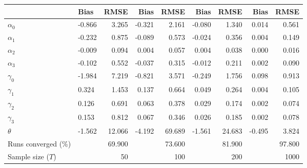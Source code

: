 
\begin{tabular}[t]{llrrrrrrr}
\toprule
  & Bias & RMSE & Bias & RMSE & Bias & RMSE & Bias & RMSE\\
\midrule
$\alpha_{0}$ & -0.866 & 3.265 & -0.321 & 2.161 & -0.080 & 1.340 & 0.014 & 0.561\\
$\alpha_{1}$ & -0.232 & 0.875 & -0.089 & 0.573 & -0.024 & 0.356 & 0.004 & 0.149\\
$\alpha_{2}$ & -0.009 & 0.094 & 0.004 & 0.057 & 0.004 & 0.038 & 0.000 & 0.016\\
$\alpha_{3}$ & -0.102 & 0.552 & -0.037 & 0.315 & -0.012 & 0.211 & 0.002 & 0.090\\
$\gamma_{0}$ & -1.984 & 7.219 & -0.821 & 3.571 & -0.249 & 1.756 & 0.098 & 0.913\\
$\gamma_{1}$ & 0.324 & 1.453 & 0.137 & 0.664 & 0.049 & 0.264 & 0.004 & 0.105\\
$\gamma_{2}$ & 0.126 & 0.691 & 0.063 & 0.378 & 0.029 & 0.174 & 0.002 & 0.074\\
$\gamma_{3}$ & 0.153 & 0.812 & 0.067 & 0.346 & 0.026 & 0.185 & 0.002 & 0.078\\
$\theta$ & -1.562 & 12.066 & -4.192 & 69.689 & -1.561 & 24.683 & -0.495 & 3.824\\
Runs converged (\%) &  & 69.900 &  & 73.600 &  & 81.900 &  & 97.800\\
Sample size ($T$) &  & 50 &  & 100 &  & 200 &  & 1000\\
\bottomrule
\end{tabular}
